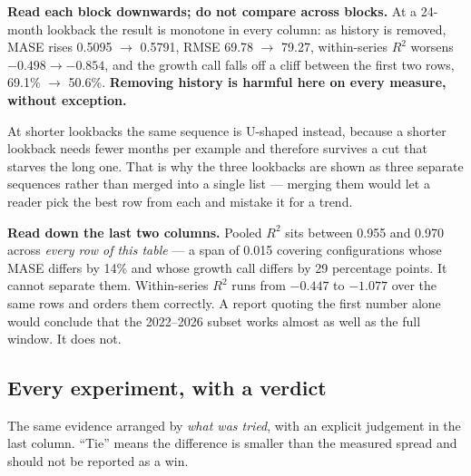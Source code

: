 \documentclass[11pt,a4paper]{article}
\newcommand{\keypoint}[1]{%
  \par\vspace{0.4em}%
  \noindent\colorbox{fed!8}{\parbox{0.98\textwidth}{\vspace{0.2em}#1\vspace{0.2em}}}%
  \par\vspace{0.4em}}
\begin{document}
\keypoint{\textbf{Read each block downwards; do not compare across blocks.} At a 24-month lookback the
result is monotone in every column: as history is removed, MASE rises 0.5095 $\rightarrow$ 0.5791, RMSE
69.78 $\rightarrow$ 79.27, within-series $R^2$ worsens $-0.498 \rightarrow -0.854$, and the growth call
falls off a cliff between the first two rows, 69.1\% $\rightarrow$ 50.6\%. \textbf{Removing history is
harmful here on every measure, without exception.}

At shorter lookbacks the same sequence is U-shaped instead, because a shorter lookback needs fewer
months per example and therefore survives a cut that starves the long one. That is why the three
lookbacks are shown as three separate sequences rather than merged into a single list --- merging them
would let a reader pick the best row from each and mistake it for a trend.}

\keypoint{\textbf{Read down the last two columns.} Pooled $R^2$ sits between 0.955 and 0.970 across
\emph{every row of this table} --- a span of 0.015 covering configurations whose MASE differs by 14\%
and whose growth call differs by 29 percentage points. It cannot separate them. Within-series $R^2$
runs from $-0.447$ to $-1.077$ over the same rows and orders them correctly. A report quoting the
first number alone would conclude that the 2022--2026 subset works almost as well as the full window.
It does not.}

\subsection{Every experiment, with a verdict}

The same evidence arranged by \emph{what was tried}, with an explicit judgement in the last column.
``Tie'' means the difference is smaller than the measured spread and should not be reported as a win.
\end{document}
